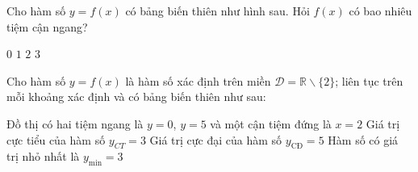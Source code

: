 \begin{ex}%
	
	Cho hàm số $y=f(x)$ có bảng biến thiên như hình sau. Hỏi $f(x)$ có bao nhiêu tiệm cận ngang?
	\begin{center}
	\end{center}
	
	
	\choice
	{$0$}
	{$1$}
	{\True $2$}
	{$3$}
\end{ex} 
\begin{ex}%
	Cho hàm số $y=f(x)$ là hàm số xác định trên miền $\mathscr{D}=\mathbb{R}\backslash\{2\}$; liên tục trên mỗi khoảng xác định và có bảng biến thiên như sau:
	\begin{center}
	\end{center}
	\choice
	{\True Đồ thị có hai tiệm ngang là $y=0$, $y=5$ và một cận tiệm đứng là $x=2$}
	{Giá trị cực tiểu của hàm số $y_{CT}=3$}
	{Giá trị cực đại của hàm số $y_{\text{CĐ}}=5$}
	{Hàm số có giá trị nhỏ nhất là $y_{\min}=3$}
\end{ex}
